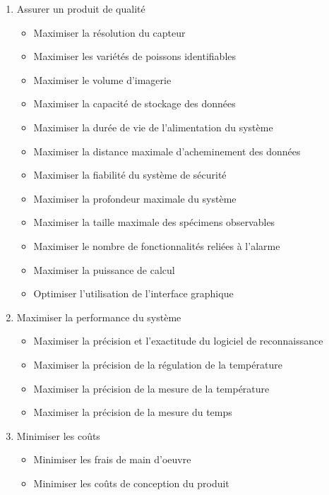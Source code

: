 \begin{enumerate}

    \item Assurer un produit de qualité
    \begin{itemize}
        \item Maximiser la résolution du capteur
        \item Maximiser les variétés de poissons identifiables
        \item Maximiser le volume d'imagerie
        \item Maximiser la capacité de stockage des données
        \item Maximiser la durée de vie de l'alimentation du système
        \item Maximiser la distance maximale d'acheminement des données
        \item Maximiser la fiabilité du système de sécurité
        \item Maximiser la profondeur maximale du système
        \item Maximiser la taille maximale des spécimens observables
        \item Maximiser le nombre de fonctionnalités reliées à l'alarme
        \item Maximiser la puissance de calcul
        \item Optimiser l'utilisation de l'interface graphique
    \end{itemize}
    
    \item Maximiser la performance du système
    \begin{itemize}
        \item Maximiser la précision et l'exactitude du logiciel de reconnaissance 
        \item Maximiser la précision de la régulation de la température
        \item Maximiser la précision de la mesure de la température
        \item Maximiser la précision de la mesure du temps
    \end{itemize}
    
    \item Minimiser les coûts
    \begin{itemize}
        \item Minimiser les frais de main d'oeuvre
        \item Minimiser les coûts de conception du produit
    \end{itemize}
    

\end{enumerate}
